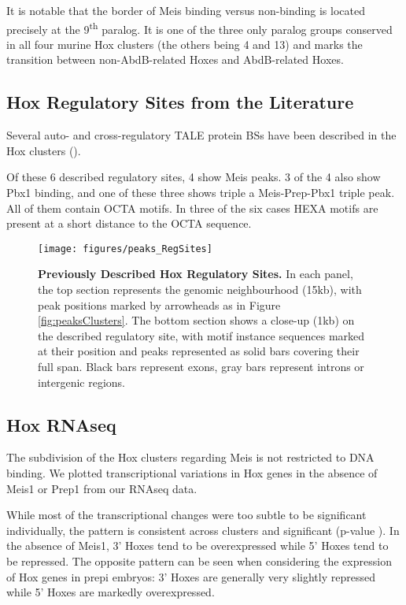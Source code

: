 It is notable that the border of Meis binding versus non-binding is located precisely at the 9\textsuperscript{th} paralog. It is one of the three only paralog groups conserved in all four murine Hox clusters (the others being 4 and 13) and marks the transition between non-AbdB-related Hoxes and AbdB-related Hoxes. 

\subsection{Hox Regulatory Sites from the Literature}

Several auto- and cross-regulatory \ac{TALE} protein \acp{BS} have been described in the Hox clusters (\cite{Lampe2008, Gould1997, Jacobs1999, Manzanares2001, Poepperl1995, Tuempel2007}). 

Of these 6 described regulatory sites, 4 show Meis peaks. 3 of the 4 also show Pbx1 binding, and one of these three shows triple a Meis-Prep-Pbx1 triple peak. All of them contain \ac{OCTA} motifs. In three of the six cases \ac{HEXA} motifs are present at a short distance to the \ac{OCTA} sequence.

\begin{figure}[]
  \centering
  \texttt{[image: figures/peaks\_RegSites]}
  \caption[Previously Described Hox Regulatory Sites]{\textbf{Previously Described Hox Regulatory Sites.} In each panel, the top section represents the genomic neighbourhood (15kb), with peak positions marked by arrowheads as in Figure \ref{fig:peaksClusters}. The bottom section shows a close-up (1kb) on the described regulatory site, with motif instance sequences marked at their position and peaks represented as solid bars covering their full span. Black bars represent exons, gray bars represent introns or intergenic regions.}
  \label{fig:RegSites}
\end{figure}

\subsection{Hox RNAseq}

The subdivision of the Hox clusters regarding Meis is not restricted to DNA binding. We plotted transcriptional variations in Hox genes in the absence of Meis1 or Prep1 from our RNAseq data. 

While most of the transcriptional changes were too subtle to be significant individually, the pattern is consistent across clusters and significant (p-value ). In the absence of Meis1, 3' Hoxes tend to be overexpressed while 5' Hoxes tend to be repressed. The opposite pattern can be seen when considering the expression of Hox genes in \ac{prepi} embryos: 3' Hoxes are generally very slightly repressed while 5' Hoxes are markedly overexpressed.

